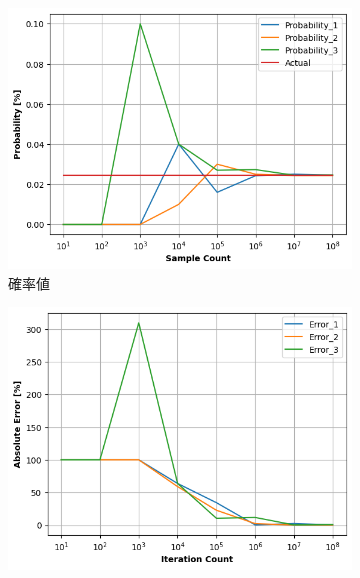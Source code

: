 \documentclass[a4j, titlepage]{jarticle}
\begin{document}
      \begin{figure}[htb]
        \begin{subfigure}[b]{0.38\textwidth}
            \centering
            \includegraphics[height=\textwidth]{../Dir_Dice/img_result4.png}
            \caption{確率値}
            \label{fig:dic4}
        \end{subfigure}
        \hspace{50pt}
        \begin{subfigure}[b]{0.38\textwidth}
          \includegraphics[height=\textwidth]{../Dir_Dice/img_error4.png}

\end{subfigure}
\end{figure}
\end{document}
